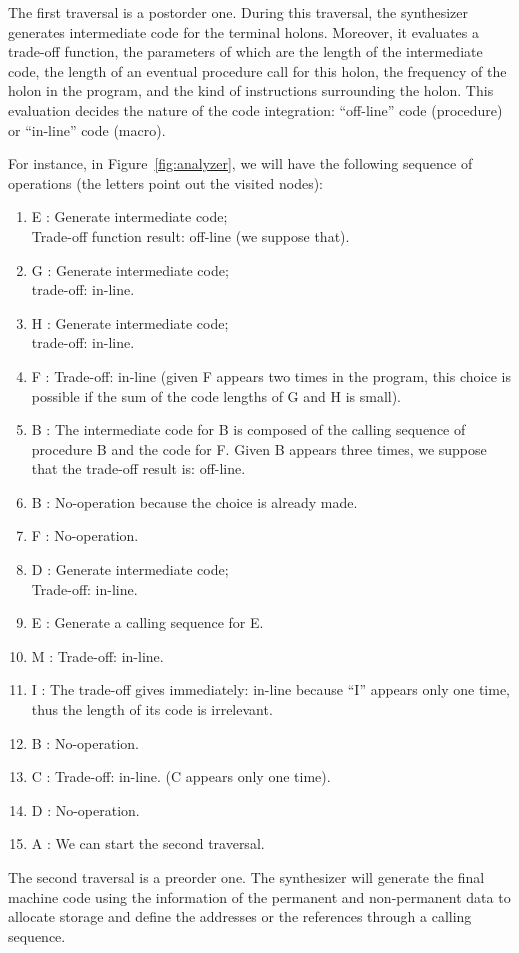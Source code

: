 \documentclass[openany,nobib]{tufte-book}
\begin{document}
The first traversal is a postorder one. During this traversal, the synthesizer
generates intermediate code for the terminal holons. Moreover, it evaluates a
trade-off function, the parameters of which are the length of the intermediate
code, the length of an eventual procedure call for this holon, the frequency of
the holon in the program, and the kind of instructions surrounding the holon.
This evaluation decides the nature of the code integration: ``off-line'' code
(procedure) or ``in-line'' code (macro).

For instance, in Figure~\ref{fig:analyzer}, we will have the following sequence
of operations (the letters point out the visited nodes):
\begin{enumerate}
    \item E : Generate intermediate code;\\
              Trade-off function result: off-line (we suppose that).
    \item G : Generate intermediate code;\\
              trade-off: in-line.
    \item H : Generate intermediate code;\\
              trade-off: in-line.
    \item F : Trade-off: in-line (given F appears two times in the program,
this choice is possible if the sum of the code lengths of G and H is small).
    \item B : The intermediate code for B is composed of the calling sequence
of procedure B and the code for F. Given B appears three times, we suppose that
the trade-off result is: off-line.
    \item B : No-operation because the choice is already made.
    \item F : No-operation.
    \item D : Generate intermediate code;\\
              Trade-off: in-line.
    \item E : Generate a calling sequence for E.
    \item M : Trade-off: in-line.
    \item I : The trade-off gives immediately: in-line because ``I'' appears
only one time, thus the length of its code is irrelevant.
    \item B : No-operation.
    \item C : Trade-off: in-line. (C appears only one time).
    \item D : No-operation.
    \item A : We can start the second traversal.
\end{enumerate}
The second traversal is a preorder one. The synthesizer will generate the final
machine code using the information of the permanent and non-permanent data to
allocate storage and define the addresses or the references through a calling
sequence.
\end{document}
